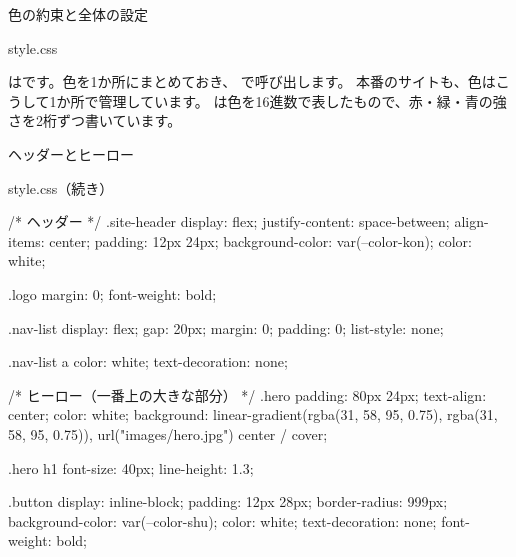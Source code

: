 \begin{step}{色の約束と全体の設定}
\begin{filebox}{style.css}
\end{filebox}
 はです。色を1か所にまとめておき、 で呼び出します。
本番のサイトも、色はこうして1か所で管理しています。
 は色を16進数で表したもので、赤・緑・青の強さを2桁ずつ書いています。
\end{step}

\begin{step}{ヘッダーとヒーロー}
\begin{filebox}{style.css（続き）}
\begin{Piton}[language=code]
/* ヘッダー */
.site-header {
  display: flex;
  justify-content: space-between;
  align-items: center;
  padding: 12px 24px;
  background-color: var(--color-kon);
  color: white;
}

.logo {
  margin: 0;
  font-weight: bold;
}

.nav-list {
  display: flex;
  gap: 20px;
  margin: 0;
  padding: 0;
  list-style: none;
}

.nav-list a {
  color: white;
  text-decoration: none;
}

/* ヒーロー（一番上の大きな部分） */
.hero {
  padding: 80px 24px;
  text-align: center;
  color: white;
  background: linear-gradient(rgba(31, 58, 95, 0.75), rgba(31, 58, 95, 0.75)),
    url("images/hero.jpg") center / cover;
}

.hero h1 {
  font-size: 40px;
  line-height: 1.3;
}

.button {
  display: inline-block;
  padding: 12px 28px;
  border-radius: 999px;
  background-color: var(--color-shu);
  color: white;
  text-decoration: none;
  font-weight: bold;
}
\end{Piton}
\end{filebox}
\end{step}

